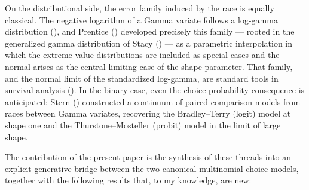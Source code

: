 \documentclass[
  man,
  floatsintext,
  longtable,
  a4paper,
  nolmodern,
  notxfonts,
  notimes,
  colorlinks=true,linkcolor=blue,citecolor=blue,urlcolor=blue]{apa7}
\begin{document}
On the distributional side, the error family induced by the race is
equally classical. The negative logarithm of a Gamma variate follows a
log-gamma distribution
(), and Prentice ()
developed precisely this family --- rooted in the generalized gamma
distribution of Stacy
() --- as a parametric
interpolation in which the extreme value distributions are included as
special cases and the normal arises as the central limiting case of the
shape parameter. That family, and the normal limit of the standardized
log-gamma, are standard tools in survival analysis
(). In
the binary case, even the choice-probability consequence is anticipated:
Stern ()
constructed a continuum of paired comparison models from races between
Gamma variates, recovering the Bradley--Terry (logit) model at shape one
and the Thurstone--Mosteller (probit) model in the limit of large shape.

The contribution of the present paper is the synthesis of these threads
into an explicit generative bridge between the two canonical multinomial
choice models, together with the following results that, to my
knowledge, are new:
\end{document}
